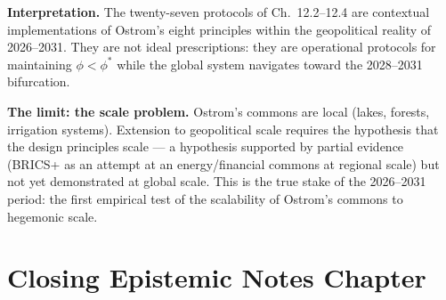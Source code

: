 \Proved{} \textbf{Interpretation.} The twenty-seven protocols of
Ch.~12.2--12.4 are contextual implementations of Ostrom's eight
principles within the geopolitical reality of 2026--2031. They are not
ideal prescriptions: they are operational protocols for maintaining
$\phi < \phi^*$ while the global system navigates toward the 2028--2031
bifurcation.

\Hypoth{} \textbf{The limit: the scale problem.} Ostrom's commons are
local (lakes, forests, irrigation systems). Extension to geopolitical
scale requires the hypothesis that the design principles scale --- a
hypothesis supported by partial evidence (BRICS+ as an attempt at an
energy/financial commons at regional scale) but not yet demonstrated at
global scale. This is the true stake of the 2026--2031 period: the first
empirical test of the scalability of Ostrom's commons to hegemonic scale.



\section{Closing Epistemic Notes
Chapter}\label{note-epistemiche-di-chiusura-chapter}

